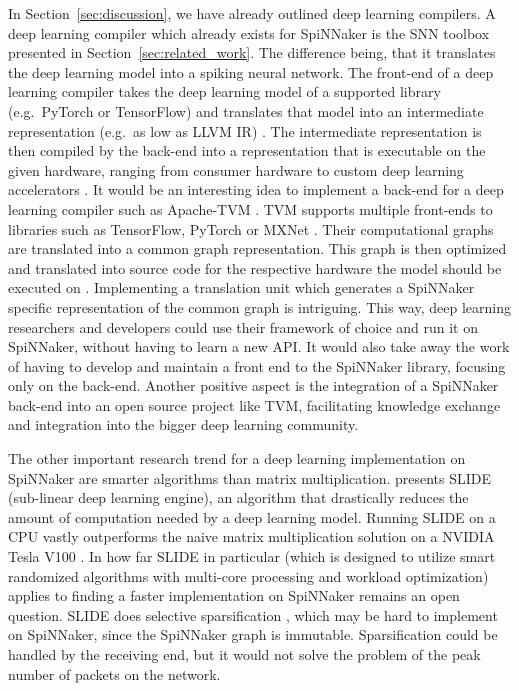 \documentclass[]{article}
\begin{document}
In Section~\ref{sec:discussion}, we have already outlined deep
learning compilers.
A deep learning compiler which already exists for SpiNNaker is the
SNN toolbox presented in Section~\ref{sec:related_work}.
The difference being, that it translates the deep learning model into
a spiking neural network.
The front-end of a deep learning compiler takes the deep learning
model of a supported library (e.g.\ PyTorch or TensorFlow) and
translates that model into an intermediate representation (e.g.\
as low as LLVM IR) \citep{li_et_al_2020}.
The intermediate representation is then compiled by the back-end into
a representation that is executable on the given hardware, ranging
from consumer hardware to custom deep learning accelerators
\citep{li_et_al_2020}.
It would be an interesting idea to implement a back-end for a
deep learning compiler such as Apache-TVM \citep{chen_et_al_2018}.
TVM supports multiple front-ends to libraries such as TensorFlow,
PyTorch or MXNet \citep{chen_et_al_2015, chen_et_al_2018}.
Their computational graphs are translated into a common graph
representation.
This graph is then optimized and translated into source code for
the respective hardware the model should be executed on
\citep{chen_et_al_2018}.
Implementing a translation unit which generates a SpiNNaker specific
representation of the common graph is intriguing.
This way, deep learning researchers and developers could use their
framework of choice and run it on SpiNNaker, without having to
learn a new API.
It would also take away the work of having to develop and maintain
a front end to the SpiNNaker library, focusing only on the back-end.
Another positive aspect is the integration of a SpiNNaker back-end
into an open source project like TVM, facilitating knowledge exchange
and integration into the bigger deep learning community.

The other important research trend for a deep learning implementation
on  SpiNNaker are smarter algorithms than matrix multiplication.
\citet{chen_et_al_2019} presents SLIDE (sub-linear deep learning
engine), an algorithm that drastically reduces the amount of
computation needed by a deep learning model.
Running SLIDE on a CPU vastly outperforms the naive matrix
multiplication solution on a NVIDIA Tesla V100
\citep{chen_et_al_2019}.
In how far SLIDE in particular (which is designed to utilize smart
randomized algorithms with multi-core processing and workload
optimization) applies to finding a faster implementation on SpiNNaker
remains an open question.
SLIDE does selective sparsification
\citep{chen_et_al_2019, blanc_et_al_2018}, which may be hard to
implement on SpiNNaker, since the SpiNNaker graph is immutable.
Sparsification could be handled by the receiving end, but it would
not solve the problem of the peak number of packets on the
network.
\end{document}
